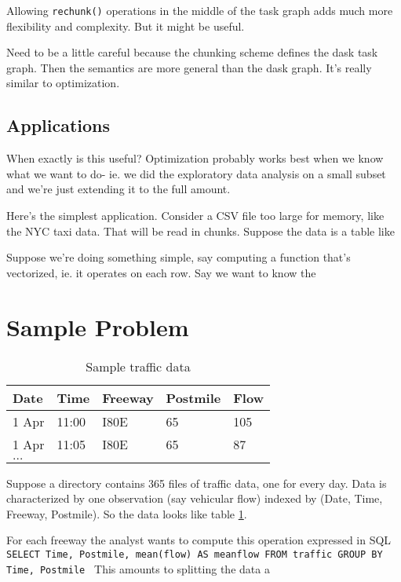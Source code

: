 \documentclass[12pt]{article}
\begin{document}
Allowing \texttt{rechunk()} operations in the middle of the task graph adds
much more flexibility and complexity. But it might be useful.

Need to be a little careful because the chunking scheme defines the dask
task graph. Then the semantics are more general than the dask graph. It's
really similar to optimization.

\subsection{Applications}

When exactly is this useful? Optimization probably works best when we know what we want
to do- ie. we did the exploratory data analysis on a small subset and we're
just extending it to the full amount.

Here's the simplest application.
Consider a CSV file too large for memory, like the NYC taxi data. 
That will
be read in chunks. Suppose the data is a table like 

Suppose we're doing something simple, say computing a
function that's vectorized, ie. it operates on each row. Say we want to
know the 

\section{Sample Problem}

\begin{table}
    \begin{tabular}{| l | l | l | l | l |}
    \hline
        Date & Time & Freeway & Postmile & Flow \\ \hline
        1 Apr & 11:00 & I80E & 65 & 105 \\ 
        1 Apr & 11:05 & I80E & 65 & 87 \\ 
        $\dots$ & & & & \\ \hline
    \end{tabular}
    \caption{Sample traffic data}
    \label{table:traffic}
\end{table}

Suppose a directory contains 365 files of traffic data, one for every day.
Data is characterized by one observation (say vehicular flow)
indexed by (Date, Time, Freeway, Postmile). So the data looks like table
\ref{table:traffic}.

For each freeway the analyst wants to compute this operation expressed in SQL
\texttt{
    SELECT Time, Postmile, mean(flow) AS meanflow FROM traffic GROUP BY Time, Postmile
}
This amounts to splitting the data a
\end{document}
